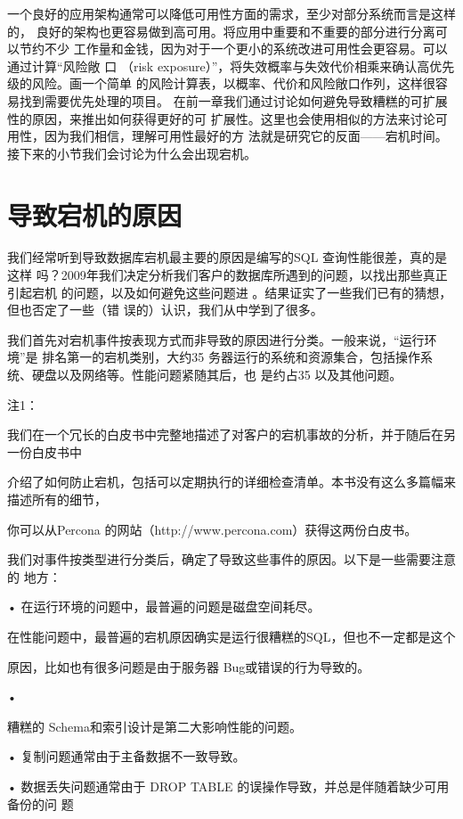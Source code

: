 一个良好的应用架构通常可以降低可用性方面的需求，至少对部分系统而言是这样的，
良好的架构也更容易做到高可用。将应用中重要和不重要的部分进行分离可以节约不少
工作量和金钱，因为对于一个更小的系统改进可用性会更容易。可以通过计算“风险敞
口 （risk exposure）”，将失效概率与失效代价相乘来确认高优先级的风险。画一个简单
的风险计算表，以概率、代价和风险敞口作列，这样很容易找到需要优先处理的项目。
在前一章我们通过讨论如何避免导致糟糕的可扩展性的原因，来推出如何获得更好的可
扩展性。这里也会使用相似的方法来讨论可用性，因为我们相信，理解可用性最好的方
法就是研究它的反面——宕机时间。接下来的小节我们会讨论为什么会出现宕机。

\section{导致宕机的原因}
我们经常听到导致数据库宕机最主要的原因是编写的SQL 查询性能很差，真的是这样
吗？2009年我们决定分析我们客户的数据库所遇到的问题，以找出那些真正引起宕机
的问题，以及如何避免这些问题进 。结果证实了一些我们已有的猜想，但也否定了一些（错
误的）认识，我们从中学到了很多。

我们首先对宕机事件按表现方式而非导致的原因进行分类。一般来说，“运行环境”是
排名第一的宕机类别，大约35%
务器运行的系统和资源集合，包括操作系统、硬盘以及网络等。性能问题紧随其后，也
是约占35%
以及其他问题。

注1：

我们在一个冗长的白皮书中完整地描述了对客户的宕机事故的分析，并于随后在另一份白皮书中

介绍了如何防止宕机，包括可以定期执行的详细检查清单。本书没有这么多篇幅来描述所有的细节，

你可以从Percona 的网站（http://www.percona.com）获得这两份白皮书。

我们对事件按类型进行分类后，确定了导致这些事件的原因。以下是一些需要注意的
地方：

• 在运行环境的问题中，最普遍的问题是磁盘空间耗尽。

在性能问题中，最普遍的宕机原因确实是运行很糟糕的SQL，但也不一定都是这个

原因，比如也有很多问题是由于服务器 Bug或错误的行为导致的。

•

糟糕的 Schema和索引设计是第二大影响性能的问题。

• 复制问题通常由于主备数据不一致导致。

• 数据丢失问题通常由于 DROP TABLE 的误操作导致，并总是伴随着缺少可用备份的问
题

